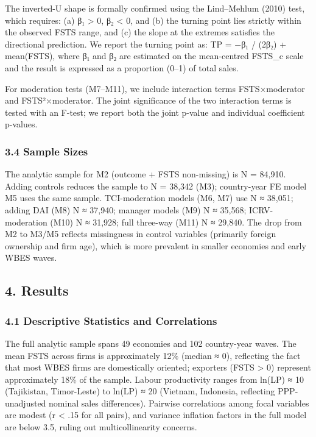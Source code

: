 \documentclass[
  12pt,a4paper]{article}
\begin{document}
The inverted-U shape is formally confirmed using the Lind--Mehlum (2010)
test, which requires: (a) β₁ \textgreater{} 0, β₂ \textless{} 0, and (b)
the turning point lies strictly within the observed FSTS range, and (c)
the slope at the extremes satisfies the directional prediction. We
report the turning point as: TP = −β₁ / (2β₂) + mean(FSTS), where β₁ and
β₂ are estimated on the mean-centred FSTS\_c scale and the result is
expressed as a proportion (0--1) of total sales.

For moderation tests (M7--M11), we include interaction terms
FSTS×moderator and FSTS²×moderator. The joint significance of the two
interaction terms is tested with an F-test; we report both the joint
p-value and individual coefficient p-values.

\hypertarget{sample-sizes}{%
\subsubsection{3.4 Sample Sizes}\label{sample-sizes}}

The analytic sample for M2 (outcome + FSTS non-missing) is N = 84,910.
Adding controls reduces the sample to N = 38,342 (M3); country-year FE
model M5 uses the same sample. TCI-moderation models (M6, M7) use N ≈
38,051; adding DAI (M8) N ≈ 37,940; manager models (M9) N ≈ 35,568;
ICRV-moderation (M10) N ≈ 31,928; full three-way (M11) N ≈ 29,840. The
drop from M2 to M3/M5 reflects missingness in control variables
(primarily foreign ownership and firm age), which is more prevalent in
smaller economies and early WBES waves.

\hypertarget{results}{%
\subsection{4. Results}\label{results}}

\hypertarget{descriptive-statistics-and-correlations}{%
\subsubsection{4.1 Descriptive Statistics and
Correlations}\label{descriptive-statistics-and-correlations}}

The full analytic sample spans 49 economies and 102 country-year waves.
The mean FSTS across firms is approximately 12\% (median ≈ 0),
reflecting the fact that most WBES firms are domestically oriented;
exporters (FSTS \textgreater{} 0) represent approximately 18\% of the
sample. Labour productivity ranges from ln(LP) ≈ 10 (Tajikistan,
Timor-Leste) to ln(LP) ≈ 20 (Vietnam, Indonesia, reflecting
PPP-unadjusted nominal sales differences). Pairwise correlations among
focal variables are modest (\textbar r\textbar{} \textless{} .15 for all
pairs), and variance inflation factors in the full model are below 3.5,
ruling out multicollinearity concerns.
\end{document}
